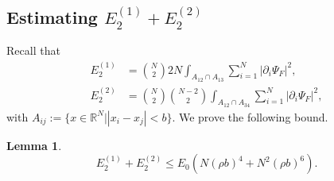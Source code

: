 \documentclass[a4paper,11pt]{article}
\newcommand{\abs}[1]{\left\lvert #1 \right\rvert}
\newcommand{\R}{\mathbb{R}}
\newtheorem{lemma}[theorem]{Lemma}
\numberwithin{equation}{section}
\begin{document}
		\subsection{Estimating $E_2^{(1)}+E_2^{(2)}$}
		\label{secE2}
		Recall that \begin{equation}
		\begin{aligned}
		E_2^{(1)}&=\binom{N}{2}2N\int_{A_{12}\cap A_{13}}\sum_{i=1}^{N}\abs{\partial_i\Psi_F}^2,\\ E_2^{(2)}&=\binom{N}{2}\binom{N-2}{2}\int_{A_{12}\cap A_{34}}\sum_{i=1}^{N}\abs{\partial_i\Psi_F}^2,
		\end{aligned}
		\end{equation}
		with $A_{ij}:=\{x\in\R^N\vert \abs{x_i-x_j}<b\}$. We prove the following bound. 
		\begin{lemma}\label{LemmaE2Bound}
			\begin{equation}
			E_2^{(1)}+E_2^{(2)}\leq E_0\left(N(\rho b)^4+N^2(\rho b)^6\right).
			\end{equation}
		\end{lemma}
\end{document}
